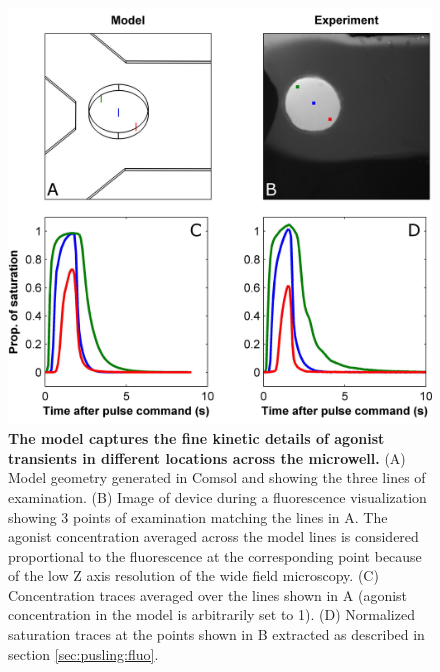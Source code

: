   \begin{figure}[!htb]
       \centering
       \includegraphics[width=12.8cm]{chapter6/figures/modelValidationIllustration/modelValidationIllustration.jpg}
       \caption[Comparison between model predictions and measured agonist time course]{\textbf{The model captures the fine kinetic details of agonist transients in different locations across the microwell.} (A) Model geometry generated in Comsol and showing the three lines of examination. (B) Image of device during a fluorescence visualization showing 3 points of examination matching the lines in A. The agonist concentration averaged across the model lines is considered proportional to the fluorescence at the corresponding point because of the low Z axis resolution of the wide field microscopy. (C) Concentration traces averaged over the lines shown in A (agonist concentration in the model is arbitrarily set to 1). (D) Normalized saturation traces at the points shown in B extracted as described in section \ref{sec:pusling:fluo}.}
       \label{fig:pulses:modelValidationIllustration}
  \end{figure}

